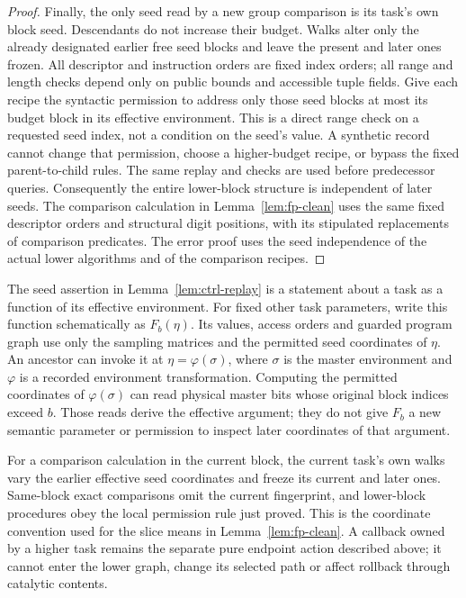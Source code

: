 \begin{proof}
Finally, the only seed read by a new group comparison is its task's
own block seed.  Descendants do not increase their budget.  Walks alter
only the already designated earlier free seed blocks and leave the
present and later ones frozen.  All descriptor and instruction orders
are fixed index orders; all range and length checks depend only on
public bounds and accessible tuple fields.  Give each recipe the
syntactic permission to address only those seed blocks at most its
budget block in its effective environment.  This is a direct range check
on a requested seed index,
not a condition on the seed's value.  A synthetic record cannot change
that permission, choose a higher-budget recipe, or bypass the fixed
parent-to-child rules.  The same replay and checks are used before
predecessor queries.  Consequently the entire lower-block structure is
independent of later seeds.  The comparison calculation in
Lemma~\ref{lem:fp-clean} uses the same fixed descriptor orders and
structural digit positions, with its stipulated replacements of comparison
predicates.  The error proof uses the seed independence of the actual lower
algorithms and of the comparison recipes.
\end{proof}

\begin{remark}
\label{rem:ctrl-effective-environment}
The seed assertion in Lemma~\ref{lem:ctrl-replay} is a statement about a
task as a function of its effective environment.  For fixed other task
parameters, write this function schematically as $F_b(\eta)$.  Its
values, access orders and guarded program graph use only the sampling
matrices and the permitted seed coordinates of $\eta$.  An ancestor can
invoke it at $\eta=\varphi(\sigma)$, where $\sigma$ is the master
environment and $\varphi$ is a recorded environment transformation.
Computing the permitted coordinates of $\varphi(\sigma)$ can read
physical master bits whose original block indices exceed $b$.  Those
reads derive the effective argument; they do not give $F_b$ a new
semantic parameter or permission to inspect later coordinates of that
argument.

For a comparison calculation in the current block, the current task's own
walks vary the earlier effective seed coordinates and freeze its current
and later ones.  Same-block exact comparisons omit the current fingerprint, and
lower-block procedures obey the local permission rule just proved.
This is the coordinate convention used for the slice means in
Lemma~\ref{lem:fp-clean}.  A callback owned by a higher task remains the
separate pure endpoint action described above; it cannot enter the lower
graph, change its selected path or affect rollback through catalytic
contents.
\end{remark}

